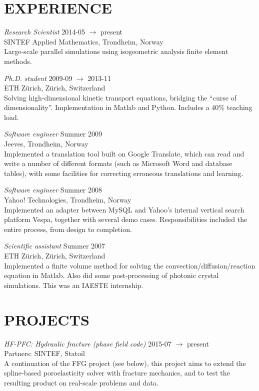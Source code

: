 \documentclass[line,margin]{res}
\newcommand{\zh}{Z\"{u}rich}
\begin{document}
\begin{resume}
\section{EXPERIENCE}

{\em Research Scientist} \hfill 2014-05 $\to$ present \\
SINTEF Applied Mathematics, Trondheim, Norway \\
Large-scale parallel simulations using isogeometric analysis finite element methods.

{\em Ph.D. student} \hfill 2009-09 $\to$ 2013-11 \\
ETH \zh, \zh, Switzerland \\
Solving high-dimensional kinetic transport equations, bridging the ``curse of dimensionality''.
Implementation in Matlab and Python. Includes a 40\% teaching load.

{\em Software engineer} \hfill Summer 2009 \\
Jeeves, Trondheim, Norway \\
Implemented a translation tool built on Google Translate, which can read and write a number of
different formats (such as Microsoft Word and database tables), with some facilities for correcting
erroneous translations and learning.

{\em Software engineer} \hfill Summer 2008 \\
Yahoo! Technologies, Trondheim, Norway \\
Implemented an adapter between MySQL and Yahoo's internal vertical search platform Vespa, together
with several demo cases. Responsibilities included the entire process, from design to completion.

{\em Scientific assistant} \hfill Summer 2007 \\
ETH \zh, \zh, Switzerland \\
Implemented a finite volume method for solving the convection/diffusion/reaction equation in
Matlab. Also did some post-processing of photonic crystal simulations. This was an IAESTE
internship.

\newpage


\section{PROJECTS}

{\em HF-PFC: Hydraulic fracture (phase field code)}
\hfill 2015-07 $\to$ present \\
{\small Partners: SINTEF, Statoil} \\
A continuation of the FFG project (see below), this project aims to extend the
spline-based poroelasticity solver with fracture mechanics, and to test the
resulting product on real-scale problems and data.


\end{resume}
\end{document}
